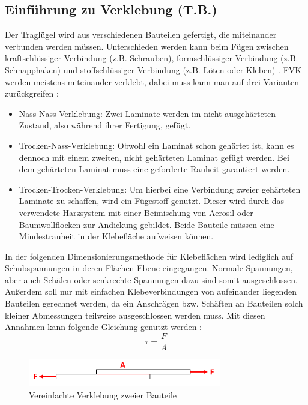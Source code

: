 \subsection{Einführung zu Verklebung (T.B.)}\label{Verklebung}
Der Traglügel wird aus verschiedenen Bauteilen gefertigt, die miteinander verbunden werden müssen. Unterschieden werden kann beim Fügen zwischen kraftschlüssiger Verbindung (z.B. Schrauben), formschlüssiger Verbindung (z.B. Schnapphaken) und stoffschlüssiger Verbindung (z.B. Löten oder Kleben) \cite{item23}. FVK werden meistens miteinander verklebt, dabei muss kann man auf drei Varianten zurückgreifen \cite{item4}:
\begin{itemize}
	\item Nass-Nass-Verklebung: Zwei Laminate werden im nicht ausgehärteten Zustand, also während ihrer Fertigung, gefügt.
	\item Trocken-Nass-Verklebung: Obwohl ein Laminat schon gehärtet ist, kann es dennoch mit einem zweiten, nicht gehärteten Laminat gefügt werden. Bei dem gehärteten Laminat muss eine geforderte Rauheit garantiert werden.
	\item Trocken-Trocken-Verklebung: Um hierbei eine Verbindung zweier gehärteten Laminate zu schaffen, wird ein Fügestoff genutzt. Dieser wird durch das verwendete Harzsystem mit einer Beimischung von Aerosil oder Baumwollflocken zur Andickung gebildet. Beide Bauteile müssen eine Mindestrauheit in der Klebefläche aufweisen können.
\end{itemize}

\noindent In der folgenden Dimensionierungsmethode für Klebeflächen wird lediglich auf Schubspannungen in deren Flächen-Ebene eingegangen. Normale Spannungen, aber auch Schälen oder senkrechte Spannungen dazu sind somit ausgeschlossen. Außerdem soll nur mit einfachen Klebeverbindungen von aufeinander liegenden Bauteilen gerechnet werden, da ein Anschrägen bzw. Schäften an Bauteilen solch kleiner Abmessungen teilweise ausgeschlossen werden muss. Mit diesen Annahmen kann folgende Gleichung genutzt werden \cite{item23}:
\begin{equation}
	\tau=\frac{F}{A}
\end{equation}
\begin{figure}[h]
	\centering
	\includegraphics[width=0.75\textwidth]{Bilder/Kleben.png}
	\caption{Vereinfachte Verklebung zweier Bauteile}
\end{figure}
\FloatBarrier

